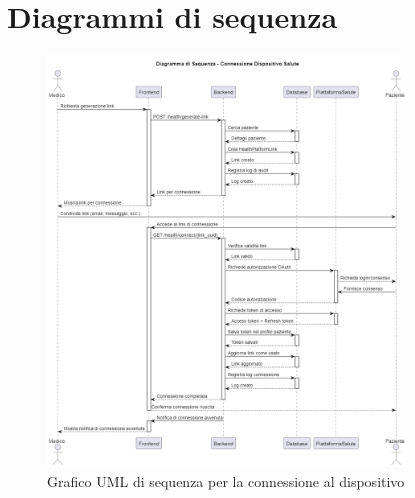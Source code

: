 \documentclass[12pt,a4paper,oneside]{report}
\begin{document}
\section{Diagrammi di sequenza}
\begin{figure}[H]
    \centering
    \includegraphics[width=0.85\textwidth]{images/uml/HealthDeviceConnection.png}
    \caption{Grafico UML di sequenza per la connessione al dispositivo}
    \label{fig:uml-seq-conn-graph}
\end{figure}
\end{document}
